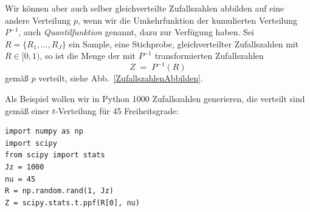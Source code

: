 Wir können aber auch selber gleichverteilte Zufallszahlen abbilden auf eine andere Verteilung $p$,
wenn wir die Umkehrfunktion der kumulierten Verteilung $P^{-1}$, auch \textsl{Quantilfunktion} genannt, dazu zur Verfügung haben.
Sei $R = \{R_1, \dots, R_J\}$ ein Sample, eine Stichprobe, gleichverteilter Zufallszahlen mit
$R \in [0,1)$, so ist die Menge der mit $P^{-1}$ transformierten Zufallszahlen
$$
Z \; = \; P^{-1}(R)
$$
gemäß $p$ verteilt, siehe Abb.~\ref{ZufallszahlenAbbilden}.

Als Beispiel wollen wir in Python 1000 Zufalls\-zahlen generieren,
die verteilt sind gemäß einer $t$-Verteilung für 45 Freiheitsgrade:
\begin{lstlisting}[style=Python]
import numpy as np
import scipy
from scipy import stats
Jz = 1000
nu = 45
R = np.random.rand(1, Jz)
Z = scipy.stats.t.ppf(R[0], nu)
\end{lstlisting}

